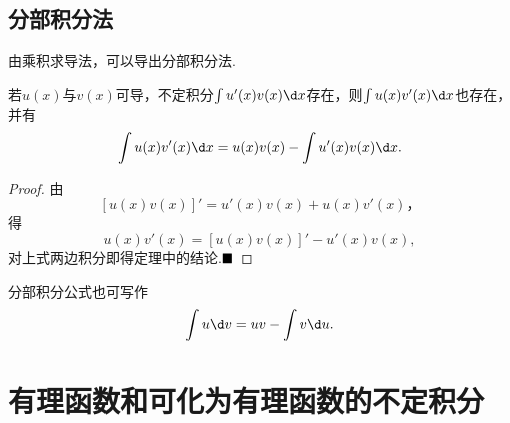 \subsection{分部积分法}
由乘积求导法，可以导出分部积分法.
\begin{theorem}[分部积分法]
	若$u(x)$与$v(x)$可导，不定积分$\int u'(x)v(x)\d x$存在，则$\int u(x)v'(x)\d x$也存在，并有
	$$\int u(x)v'(x)\d x=u(x)v(x)-\int u'(x)v(x)\d x.$$
\end{theorem}
\begin{proof}
	由$$\left[u(x)v(x)\right]'=u'(x)v(x)+u(x)v'(x)，$$
	得$$u(x)v'(x)=\left[u(x)v(x)\right]'-u'(x)v(x),$$
	对上式两边积分即得定理中的结论.$\hfill\blacksquare$
\end{proof}
分部积分公式也可写作
$$\int u\d v=uv-\int v\d u.$$
\section{有理函数和可化为有理函数的不定积分}